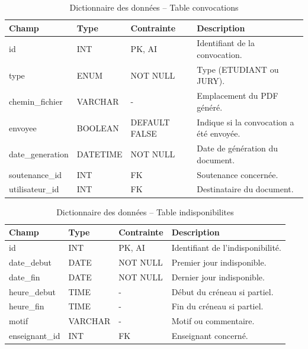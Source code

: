 \documentclass[12pt,a4paper]{article}
\begin{document}
\begin{table}[H]
    \centering
    \small
    \begin{tabular}{lp{2cm}lp{6cm}}
        \toprule
        \rowcolor{primary!10}
        \textbf{Champ} & \textbf{Type} & \textbf{Contrainte} & \textbf{Description}                      \\
        \midrule
        id             & INT           & PK, AI              & Identifiant de la convocation.            \\
        type           & ENUM          & NOT NULL            & Type (ETUDIANT ou JURY).                  \\
        chemin\_fichier & VARCHAR      & -                   & Emplacement du PDF généré.                \\
        envoyee        & BOOLEAN       & DEFAULT FALSE       & Indique si la convocation a été envoyée.  \\
        date\_generation & DATETIME    & NOT NULL            & Date de génération du document.           \\
        soutenance\_id & INT           & FK                  & Soutenance concernée.                     \\
        utilisateur\_id & INT          & FK                  & Destinataire du document.                 \\
        \bottomrule
    \end{tabular}
    \caption{Dictionnaire des données -- Table convocations}
\end{table}

\begin{table}[H]
    \centering
    \small
    \begin{tabular}{lp{2cm}lp{6cm}}
        \toprule
        \rowcolor{primary!10}
        \textbf{Champ} & \textbf{Type} & \textbf{Contrainte} & \textbf{Description}                      \\
        \midrule
        id             & INT           & PK, AI              & Identifiant de l'indisponibilité.         \\
        date\_debut    & DATE          & NOT NULL            & Premier jour indisponible.                \\
        date\_fin      & DATE          & NOT NULL            & Dernier jour indisponible.                \\
        heure\_debut   & TIME          & -                   & Début du créneau si partiel.              \\
        heure\_fin     & TIME          & -                   & Fin du créneau si partiel.                \\
        motif          & VARCHAR       & -                   & Motif ou commentaire.                     \\
        enseignant\_id & INT           & FK                  & Enseignant concerné.                      \\
        \bottomrule
    \end{tabular}
    \caption{Dictionnaire des données -- Table indisponibilites}
\end{table}
\end{document}
